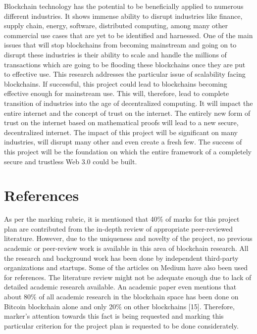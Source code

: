 \documentclass[a4paper,twoside,phd]{BYUPhys}
\begin{document}
Blockchain technology has the potential to be beneficially applied to numerous different industries. It shows immense ability to disrupt industries like finance, supply chain, energy, software, distributed computing, among many other commercial use cases that are yet to be identified and harnessed. One of the main issues that will stop blockchains from becoming mainstream and going on to disrupt these industries is their ability to scale and handle the millions of transactions which are going to be flooding these blockchains once they are put to effective use. This research addresses the particular issue of scalability facing blockchains. If successful, this project could lead to blockchains becoming effective enough for mainstream use. This will, therefore, lead to complete transition of industries into the age of decentralized computing. It will impact the entire internet and the concept of trust on the internet. The entirely new form of trust on the internet based on mathematical proofs will lead to a new secure, decentralized internet. The impact of this project will be significant on many industries, will disrupt many other and even create a fresh few. The success of this project will be the foundation on which the entire framework of a completely secure and trustless Web 3.0 could be built.

\section{References}
As per the marking rubric, it is mentioned that 40\% of marks for this project plan are contributed from the in-depth review of appropriate peer-reviewed literature. However, due to the uniqueness and novelty of the project, no previous academic or peer-review work is available in this area of blockchain research. All the research and background work has been done by independent third-party organizations and startups. Some of the articles on Medium have also been used for references. The literature review might not be adequate enough due to lack of detailed academic research available. An academic paper even mentions that about 80\% of all academic research in the blockchain space has been done on Bitcoin blockchain alone and only 20\% on other blockchains [15]. Therefore, marker’s attention towards this fact is being requested and marking this particular criterion for the project plan is requested to be done considerately.

%

%

%
\end{document}
